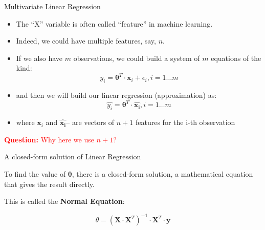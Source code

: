\documentclass{beamer}
\begin{document}
\begin{frame}
{\centerline{Multivariate Linear Regression }}

\begin{itemize}
\item The ``X'' variable is often called ``feature'' in machine learning.
\item Indeed, we could have multiple features, say, $n$.
\item If we also have $m$ observations, we could build a system of $m$ equations of the kind:
$$ y_i = \boldsymbol \theta^T \cdot \boldsymbol x_i + \epsilon_i, i=1\ldots m$$
\item and then we will build our linear regression (approximation) as:
$$ \hat{y_i} = \boldsymbol \theta^T \cdot \boldsymbol{\hat{x_i}}, i=1\ldots m$$

\item where $\boldsymbol x_i$ and  $\boldsymbol{\hat{x_i}}$-- are vectors of $n+1$ features for the i-th observation
\end{itemize}

\textcolor{red}{\textbf{Question:} Why here we use $n+1$?}
\end{frame}

\begin{frame}
{\centerline{A closed-form solution of Linear Regression }}

To find the value of $\boldsymbol \theta$, there is a closed-form solution, a mathematical equation that gives the result directly.  

This is called the \textbf{Normal Equation}:

$$\theta = (\boldsymbol X \cdot \boldsymbol X^T)^{-1} \cdot \boldsymbol X^T \cdot \boldsymbol y$$


\end{frame}
\end{document}
